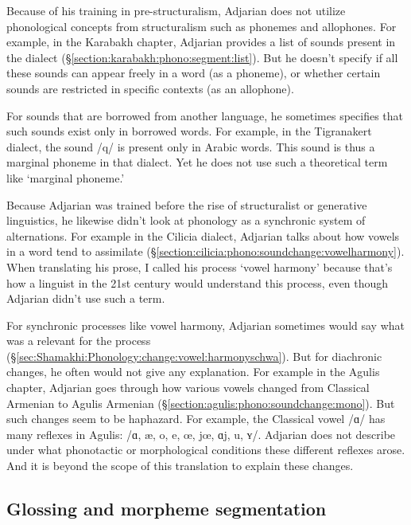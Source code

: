 Because of his training in pre-structuralism, Adjarian does not utilize phonological concepts from structuralism such as phonemes and allophones. For example, in the Karabakh chapter, Adjarian provides a list of sounds present in the dialect (\S\ref{section:karabakh:phono:segment:list}). But he doesn't specify if all these sounds can appear freely in a word (as a phoneme), or whether certain sounds are restricted in specific contexts (as an allophone). 
	
For sounds that are borrowed from another language, he sometimes specifies that such sounds exist only in borrowed words. For example, in the Tigranakert dialect, the sound /q/ is present only in Arabic words. This sound is thus a marginal phoneme in that dialect. Yet he does not use such a theoretical term like `marginal phoneme.'

Because Adjarian was trained before the rise of structuralist or generative linguistics, he likewise didn't look at  phonology as a synchronic system of alternations. For example in the Cilicia dialect, Adjarian talks about how vowels in a word tend to assimilate (\S\ref{section:cilicia:phono:soundchange:vowelharmony}). When translating his prose, I called his process `vowel harmony' because that's how a linguist in the 21st century would understand this process, even though Adjarian didn't use such a term. 

For synchronic processes like vowel harmony, Adjarian sometimes would say what was a relevant for the process (\S\ref{sec:Shamakhi:Phonology:change:vowel:harmonyschwa}). But for diachronic changes, he often would not give  any explanation. For example in the Agulis chapter, Adjarian goes through how various   vowels changed from Classical Armenian to Agulis Armenian (\S\ref{section:agulis:phono:soundchange:mono}). But such changes seem to be haphazard. For example, the  Classical vowel /ɑ/ has many reflexes in Agulis:  /ɑ, æ, o, e, œ, jœ, ɑj, u, ʏ/. Adjarian does not describe under what phonotactic or morphological conditions these different reflexes arose. And it is beyond the scope of this translation to explain these changes. 

	
 
\subsection{Glossing and morpheme segmentation }\label{sec:HossepIntro:translation:gloss}





